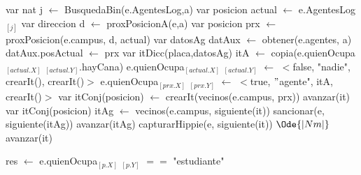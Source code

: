 \begin{algorithm}[H]
\begin{algorithmic}[1]
 
    \State var nat j $\gets$ BusquedaBin(e.AgentesLog,a) 
    \State var posicion actual $\gets$ e.AgentesLog$_{[j]}$ 
    \State var direccion d $\gets$ proxPosicionA(e,a) 
    \State var posicion prx $\gets$ proxPosicion(e.campus, d, actual) 
    \State var datosAg datAux $\gets$ obtener(e.agentes, a) 
    \State datAux.posActual $\gets$ prx 
    \State var itDicc(placa,datosAg) itA $\gets$ copia(e.quienOcupa$_{[actual.X]}$ $_{[actual.Y]}$.hayCana) 
    \State e.quienOcupa$_{[actual.X]}$ $_{[actual.Y]}$ $\gets$ $<$false, "nadie", crearIt(), crearIt()$>$ 
    \State e.quienOcupa$_{[prx.X]}$ $_{[prx.Y]}$ $\gets$ $<$true, $"$agente", itA, crearIt()$>$ 
    \State var itConj(posicion) $\gets$ crearIt(vecinos(e.campus, prx)) 
     
    		\State avanzar(it)
    	\Else
    		 
    			\State var itConj(posicion) itAg $\gets$ vecinos(e.campus, siguiente(it)) 
    			  
    				  
    					\State sancionar(e, siguiente(itAg))  
    				\EndIf
	    			\State avanzar(itAg)
    			\EndWhile
    		\Else
    			  
    				\State capturarHippie(e, siguiente(it))  \Comment $\Ode{\vert Nm \vert}$
    			\EndIf
    		\EndIf
    	\EndIf	
    	\State avanzar(it)
    \EndWhile
    
\EndFunction
\end{algorithmic}
\end{algorithm}

\begin{algorithm}[H]
\begin{algorithmic}[1]
 
    \State res $\gets$ e.quienOcupa$_{[p.X]}$ $_{[p.Y]}$ $==$ "estudiante"
\EndFunction
\end{algorithmic}
\end{algorithm}

